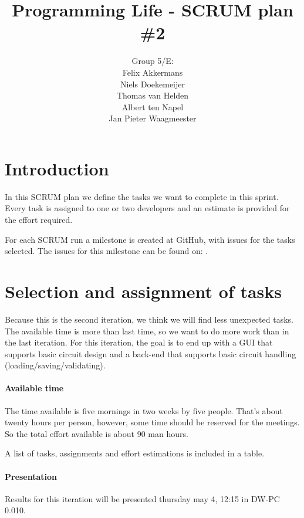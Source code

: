 \documentclass[a4paper]{article}
\title{Programming Life - SCRUM plan \#2}
\author{Group 5/E:\\
Felix Akkermans \\
Niels Doekemeijer \\
Thomas van Helden \\
Albert ten Napel \\
Jan Pieter Waagmeester}
\begin{document}
\maketitle

\section{Introduction}
In this SCRUM plan we define the tasks we want to complete in this sprint. Every task is assigned to one or two developers and an estimate is provided for the effort required.

For each SCRUM run a milestone is created at GitHub, with issues for the tasks selected. The issues for this milestone can be found on: .

\section{Selection and assignment of tasks}
Because this is the second iteration, we think we will find less unexpected tasks. The available time is more than last time, so we want to do more work than in the last iteration. For this iteration, the goal is to end up with a GUI that supports basic circuit design and a back-end that supports basic circuit handling (loading/saving/validating).

\paragraph{Available time}
The time available is five mornings in two weeks by five people. That's about twenty hours per person, however, some time should be reserved for the meetings. So the total effort available is about 90 man hours.

A list of tasks, assignments and effort estimations is included in a table.


\paragraph{Presentation}
Results for this iteration will be presented thursday may 4, 12:15 in DW-PC 0.010.
\end{document}
